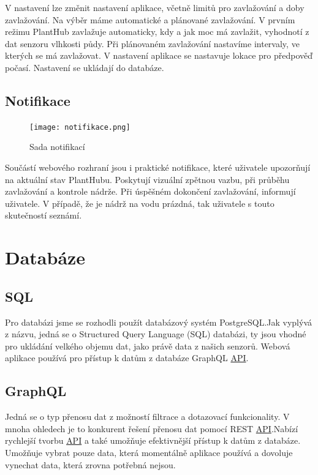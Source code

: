 \documentclass[czech,12pt,a4paper]{article}
\begin{document}
V nastavení lze změnit nastavení aplikace, včetně limitů pro zavlažování a doby zavlažování. Na výběr máme automatické a plánované zavlažování. V prvním režimu PlantHub zavlažuje automaticky, kdy a jak moc má zavlažit, vyhodnotí z dat senzoru vlhkosti půdy. Při plánovaném zavlažování nastavíme intervaly, ve kterých se má zavlažovat. V nastavení aplikace se nastavuje lokace pro předpověď počasí. Nastavení se ukládají do databáze.

\clearpage

\subsection{Notifikace}

\begin{figure}[h]
	\centering
	\texttt{[image: notifikace.png]}
	\caption{Sada notifikací}
\end{figure}

Součástí webového rozhraní jsou i praktické notifikace, které uživatele upozorňují na aktuální stav PlantHubu. Poskytují vizuální zpětnou vazbu, při průběhu zavlažování a kontrole nádrže. Při úspěšném dokončení zavlažování, informují uživatele. V případě, že je nádrž na vodu prázdná, tak uživatele s touto skutečností seznámí.

\clearpage

\section{Databáze} \label{secDB}

\subsection{SQL}

Pro databázi jsme se rozhodli použít databázový systém PostgreSQL.\@ Jak vyplývá z názvu, jedná se o Structured Query Language (SQL) databázi, ty jsou vhodné pro ukládání velkého objemu dat, jako právě data z našich senzorů. Webová aplikace používá pro přístup k datům z databáze \ac{GraphQL} \space \underline{\ac{API}}.\@

\subsection{GraphQL} \label{secGraphQL}

Jedná se o typ přenosu dat z možností filtrace a dotazovací funkcionality. V mnoha ohledech je to konkurent řešení přenosu dat pomocí \ac{REST} \space \underline{\ac{API}}.\@ Nabízí rychlejší tvorbu \underline{\ac{API}} \space a také umožňuje efektivnější přístup k datům z databáze. Umožňuje vybrat pouze data, která momentálně aplikace používá a dovoluje vynechat data, která zrovna potřebná nejsou.
\end{document}
